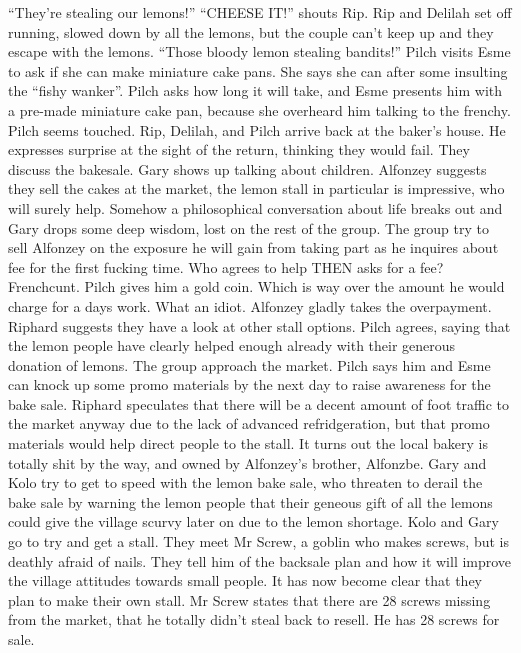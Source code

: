 “They’re stealing our lemons!”\medskip
“CHEESE IT!” shouts Rip. Rip and Delilah set off running, slowed down by all the lemons, but the couple can’t keep up and they escape with the lemons.\medskip
“Those bloody lemon stealing bandits!” Pilch visits Esme to ask if she can make miniature cake pans. She says she can after some insulting the “fishy wanker”. Pilch asks how long it will take, and Esme presents him with a pre-made miniature cake pan, because she overheard him talking to the frenchy. Pilch seems touched.\medskip
Rip, Delilah, and Pilch arrive back at the baker’s house. He expresses surprise at the sight of the return, thinking they would fail. They discuss the bakesale. Gary shows up talking about children. Alfonzey suggests they sell the cakes at the market, the lemon stall in particular is impressive, who will surely help.\medskip
Somehow a philosophical conversation about life breaks out and Gary drops some deep wisdom, lost on the rest of the group. The group try to sell Alfonzey on the exposure he will gain from taking part as he inquires about fee for the first fucking time. Who agrees to help THEN asks for a fee? Frenchcunt.\medskip
Pilch gives him a gold coin. Which is way over the amount he would charge for a days work. What an idiot. Alfonzey gladly takes the overpayment.\medskip
Riphard suggests they have a look at other stall options. Pilch agrees, saying that the lemon people have clearly helped enough already with their generous donation of lemons.\medskip
The group approach the market. Pilch says him and Esme can knock up some promo materials by the next day to raise awareness for the bake sale. Riphard speculates that there will be a decent amount of foot traffic to the market anyway due to the lack of advanced refridgeration, but that promo materials would help direct people to the stall.\medskip
It turns out the local bakery is totally shit by the way, and owned by Alfonzey’s brother, Alfonzbe.\medskip
Gary and Kolo try to get to speed with the lemon bake sale, who threaten to derail the bake sale by warning the lemon people that their geneous gift of all the lemons could give the village scurvy later on due to the lemon shortage.\medskip
Kolo and Gary go to try and get a stall. They meet Mr Screw, a goblin who makes screws, but is deathly afraid of nails. They tell him of the backsale plan and how it will improve the village attitudes towards small people. It has now become clear that they plan to make their own stall. Mr Screw states that there are 28 screws missing from the market, that he totally didn’t steal back to resell. He has 28 screws for sale.\medskip
